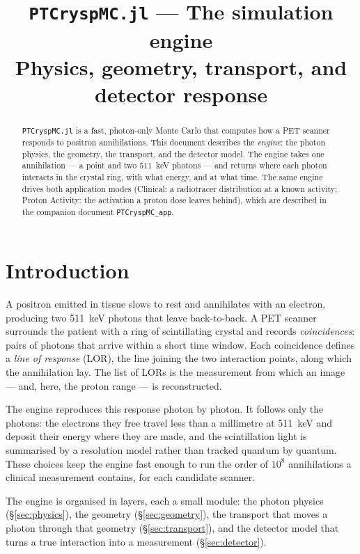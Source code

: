 \documentclass[11pt]{article}
\title{\texttt{PTCryspMC.jl} --- The simulation engine\\[2pt]
\large Physics, geometry, transport, and detector response}
\author{}
\date{}
\begin{document}
\maketitle
\begin{abstract}
\noindent
\texttt{PTCryspMC.jl} is a fast, photon-only Monte Carlo that computes how a PET scanner responds
to positron annihilations. This document describes the \emph{engine}: the photon physics, the
geometry, the transport, and the detector model. The engine takes one annihilation --- a point and
two \SI{511}{keV} photons --- and returns where each photon interacts in the crystal ring, with what
energy, and at what time. The same engine drives both application modes (Clinical: a radiotracer
distribution at a known activity; Proton Activity: the activation a proton dose leaves behind),
which are described in the companion document \texttt{PTCryspMC\_app}.
\end{abstract}

\tableofcontents

\section{Introduction}

A positron emitted in tissue slows to rest and annihilates with an electron, producing two
\SI{511}{keV} photons that leave back-to-back. A PET scanner surrounds the patient with a ring of
scintillating crystal and records \emph{coincidences}: pairs of photons that arrive within a short
time window. Each coincidence defines a \emph{line of response} (LOR), the line joining the two
interaction points, along which the annihilation lay. The list of LORs is the measurement from
which an image --- and, here, the proton range --- is reconstructed.

The engine reproduces this response photon by photon. It follows only the photons: the electrons
they free travel less than a millimetre at \SI{511}{keV} and deposit their energy where they are
made, and the scintillation light is summarised by a resolution model rather than tracked
quantum by quantum. These choices keep the engine fast enough to run the order of $10^{8}$
annihilations a clinical measurement contains, for each candidate scanner.

The engine is organised in layers, each a small module: the photon physics (\S\ref{sec:physics}),
the geometry (\S\ref{sec:geometry}), the transport that moves a photon through that geometry
(\S\ref{sec:transport}), and the detector model that turns a true interaction into a measurement
(\S\ref{sec:detector}).
\end{document}
